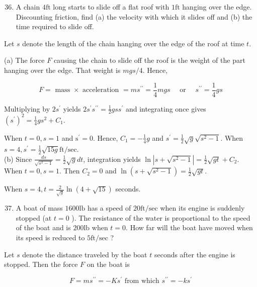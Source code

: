 \documentclass[10pt]{article}
\begin{document}
\begin{enumerate}
  \setcounter{enumi}{35}
  \item A chain $4 \mathrm{ft}$ long starts to slide off a flat roof with $1 \mathrm{ft}$ hanging over the edge. Discounting friction, find (a) the velocity with which it slides off and (b) the time required to slide off.
\end{enumerate}

Let $s$ denote the length of the chain hanging over the edge of the roof at time $t$.

(a) The force $F$ causing the chain to slide off the roof is the weight of the part hanging over the edge. That weight is $m g s / 4$. Hence,

$$
F=\text { mass } \times \text { acceleration }=m s^{\prime \prime}=\frac{1}{4} m g s \quad \text { or } \quad s^{\prime \prime}=\frac{1}{4} g s
$$

Multiplying by $2 s^{\prime}$ yields $2 s^{\prime} s^{\prime \prime}=\frac{1}{2} g s s^{\prime}$ and integrating once gives $\left(s^{\prime}\right)^{2}=\frac{1}{4} g s^{2}+C_{1}$.

When $t=0, s=1$ and $\mathrm{s}^{\prime}=0$. Hence, $C_{1}=-\frac{1}{4} g$ and $s^{\prime}=\frac{1}{2} \sqrt{g} \sqrt{s^{2}-1}$. When $s=4, s^{\prime}=\frac{1}{2} \sqrt{15 g} \mathrm{ft} / \mathrm{sec}$.\\
(b) Since $\frac{d s}{\sqrt{s^{2}-1}}=\frac{1}{2} \sqrt{g} d t$, integration yields $\ln \left|s+\sqrt{s^{2}-1}\right|=\frac{1}{2} \sqrt{g t}+C_{2}$. When $t=0, s=1$. Then $C_{2}=0$ and $\ln \left(s+\sqrt{s^{2}-1}\right)=\frac{1}{2} \sqrt{g t}$.

When $s=4, t=\frac{2}{\sqrt{g}} \ln (4+\sqrt{15})$ seconds.

\begin{enumerate}
  \setcounter{enumi}{36}
  \item A boat of mass $1600 \mathrm{lb}$ has a speed of $20 \mathrm{ft} / \mathrm{sec}$ when its engine is suddenly stopped (at $t=0$ ). The resistance of the water is proportional to the speed of the boat and is $200 \mathrm{lb}$ when $t=0$. How far will the boat have moved when its speed is reduced to $5 \mathrm{ft} / \mathrm{sec}$ ?
\end{enumerate}

Let $s$ denote the distance traveled by the boat $t$ seconds after the engine is stopped. Then the force $F$ on the boat is

$$
F=m s^{\prime \prime}=-K s^{\prime} \text { from which } s^{\prime \prime}=-k s^{\prime}
$$
\end{document}
